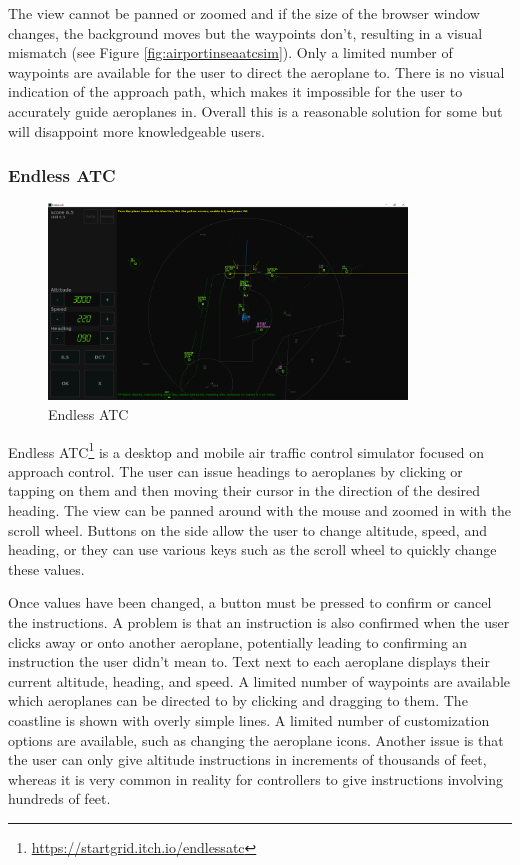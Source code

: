 \documentclass{article}
\begin{document}
The view cannot be panned or zoomed and if the size of the browser window changes, the background moves but the waypoints don't, resulting in a visual mismatch (see Figure \ref{fig:airportinseaatcsim}).
Only a limited number of waypoints are available for the user to direct the aeroplane to.
There is no visual indication of the approach path, which makes it impossible for the user to accurately guide aeroplanes in.
Overall this is a reasonable solution for some but will disappoint more knowledgeable users.

\subsubsection{Endless ATC} \label{endlessatc}
\begin{figure}[H]
\centering
\includegraphics[width=0.85\textwidth]{existing_solutions/endlessatc.png}
\caption{\label{fig:endlessatc1}Endless ATC}
\end{figure}
Endless ATC\footnote{\url{https://startgrid.itch.io/endlessatc}} is a desktop and mobile air traffic control simulator focused on approach control.
The user can issue headings to aeroplanes by clicking or tapping on them and then moving their cursor in the direction of the desired heading.
The view can be panned around with the mouse and zoomed in with the scroll wheel.
Buttons on the side allow the user to change altitude, speed, and heading, or they can use various keys such as the scroll wheel to quickly change these values.

Once values have been changed, a button must be pressed to confirm or cancel the instructions.
A problem is that an instruction is also confirmed when the user clicks away or onto another aeroplane, potentially leading to confirming an instruction the user didn't mean to.
Text next to each aeroplane displays their current altitude, heading, and speed.
A limited number of waypoints are available which aeroplanes can be directed to by clicking and dragging to them.
The coastline is shown with overly simple lines.
A limited number of customization options are available, such as changing the aeroplane icons.
Another issue is that the user can only give altitude instructions in increments of thousands of feet, whereas it is very common in reality for controllers to give instructions involving hundreds of feet.
\end{document}
